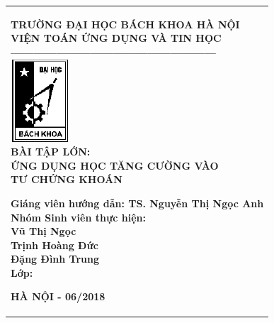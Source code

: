 \documentclass[14pt]{extreport}
\begin{document}
\newcommand{\Khung}[2]{
\begin{tabular}{|l|}
\hline\rule[-2ex]{0pt}{5.5ex}
\parbox{#1}{#2}\\
\hline
\end{tabular}
}

\Khung{.92\textwidth}{

\begin{center}
\normalsize
\textbf{TRƯỜNG ĐẠI HỌC BÁCH KHOA HÀ NỘI}\\
\normalsize
\textbf{VIỆN TOÁN ỨNG DỤNG VÀ TIN HỌC}\\
\textbf{------------------------------------------------------}\\[0.4cm]
\includegraphics[scale=.8]{logobkdentrang}\\[1.2cm]
\textbf{{ BÀI TẬP LỚN:}}\\
\textbf{{\large ỨNG DỤNG HỌC TĂNG CƯỜNG VÀO}}\\
\textbf{{\largeĐẦU TƯ CHỨNG KHOÁN}}\\
\end{center}
\begin{flushleft}
\vspace{1.3cm}
\hspace{1.5cm} \textbf{ Giáng viên hướng dẫn:{ TS. Nguyễn Thị Ngọc Anh }}\\[0.2cm]
\hspace{1.5cm} \textbf{ Nhóm Sinh viên thực hiện:}\\[0.2cm]
\hspace{7.4cm}\textbf{ Vũ Thị Ngọc}\\[0.2cm]
\hspace{7.4cm}\textbf{ Trịnh Hoàng Đức}\\[0.2cm]
\hspace{7.4cm}\textbf{ Đặng Đình Trung}\\[0.2cm]
\hspace{1.5cm} \textbf{ Lớp:\hspace{4.5cm}{ KSTN Toán Tin K60}}\\
\end{flushleft}

\begin{center}
\textbf{{\small HÀ NỘI - 06/2018}}\\
\end{center}
 }
\thispagestyle{empty}
\newpage
\end{document}
